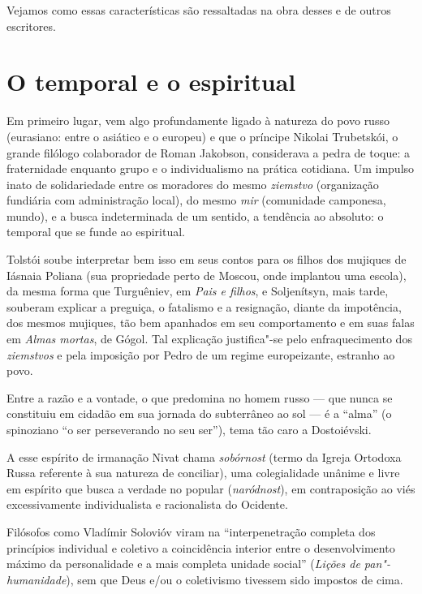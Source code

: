 Vejamos como essas características são ressaltadas na obra desses e de
outros escritores.

\section{\uppercase{O} temporal e o espiritual}

Em primeiro lugar, vem algo profundamente ligado à natureza do povo
russo (eurasiano: entre o asiático e o europeu) e que o príncipe Nikolai
Trubetskói, o grande filólogo colaborador de Roman Jakobson, considerava
a pedra de toque: a fraternidade enquanto grupo e o individualismo na
prática cotidiana. Um impulso inato de solidariedade entre os moradores
do mesmo \emph{ziemstvo} (organização fundiária com administração
local), do mesmo \emph{mir} (comunidade camponesa, mundo), e a busca indeterminada de um sentido, a tendência ao absoluto: o temporal que se funde ao espiritual.

Tolstói soube interpretar bem isso em seus contos para os filhos dos mujiques de Iásnaia Poliana (sua propriedade perto de Moscou, onde implantou uma escola), da mesma forma que Turguêniev, em \emph{Pais e filhos}, e Soljenítsyn, mais tarde, souberam explicar a preguiça, o fatalismo e a resignação, diante da impotência, dos mesmos mujiques, tão bem apanhados em seu comportamento e em suas falas em \emph{Almas mortas}, de Gógol. Tal explicação justifica"-se pelo enfraquecimento dos \emph{ziemstvos} e pela imposição por Pedro  de um regime europeizante, estranho ao povo.

Entre a razão e a vontade, o que predomina no homem russo --- que nunca se constituiu em cidadão em sua jornada do subterrâneo ao sol --- é a ``alma'' (o spinoziano ``o ser perseverando no seu ser''), tema tão caro a Dostoiévski.

A esse espírito de irmanação Nivat chama \emph{sobórnost} (termo da Igreja Ortodoxa Russa referente à sua natureza de conciliar), uma colegialidade unânime e livre em espírito que busca a verdade no popular (\emph{naródnost}), em contraposição ao viés excessivamente individualista e racionalista do Ocidente.

Filósofos como Vladímir Solovióv viram na ``interpenetração completa dos princípios individual e coletivo a coincidência interior entre o desenvolvimento máximo da personalidade e a mais completa unidade social'' (\emph{Lições de pan"-humanidade}), sem que Deus e/ou o coletivismo tivessem sido impostos de cima.

